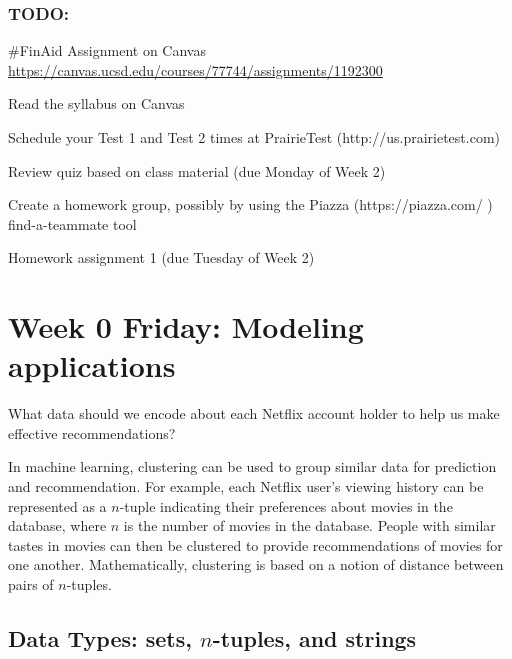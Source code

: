\documentclass[12pt, oneside]{article}
\begin{document}
\subsubsection*{TODO:}
\begin{list}
   {\itemsep2pt}
   \item \#FinAid Assignment on Canvas \url{https://canvas.ucsd.edu/courses/77744/assignments/1192300} 
   \item Read the syllabus on Canvas
   \item Schedule your Test 1 and Test 2 times at PrairieTest (http://us.prairietest.com)
   \item Review quiz based on class material (due Monday of Week 2)
   \item Create a homework group, possibly by using the Piazza (https://piazza.com/ ) find-a-teammate tool
   \item Homework assignment 1 (due Tuesday of Week 2)
\end{list}

\newpage

\section*{Week 0 Friday: Modeling applications}


What data should we encode about each Netflix account holder to help us make effective recommendations?

\vfill
\vfill

In machine learning, clustering can be used to group similar data for prediction and recommendation.  For example,
each Netflix user's viewing history can be represented as a $n$-tuple indicating their preferences about
movies in the database, where $n$ is the number of movies in the database.  People with similar tastes in movies can then be clustered to provide recommendations
of movies for one another.  Mathematically, clustering is based on a notion of distance between pairs of $n$-tuples.
 
\vfill
\subsection*{Data Types: sets, $n$-tuples, and strings}
\end{document}
